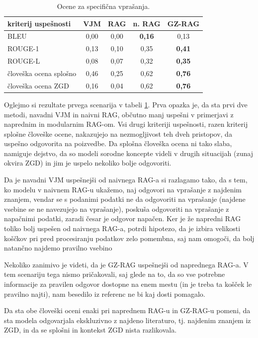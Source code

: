 \documentclass[a4paper,12pt,openright]{book}
\begin{document}
\begin{table}[H]
	\centering
	\caption{Ocene za specifična vprašanja.}
	\begin{tabular}{|l|c|c|c|c|}
		\hline
		kriterij uspešnosti    & VJM  & RAG  & n. RAG        & GZ-RAG        \\ \hline
		BLEU                   & 0,00 & 0,00 & \textbf{0,16} & 0,13          \\ \hline
		ROUGE-1                & 0,13 & 0,10 & 0,35          & \textbf{0,41} \\ \hline
		ROUGE-L                & 0,08 & 0,07 & 0,32          & \textbf{0,35} \\ \hline
		človeška ocena splošno & 0,46 & 0,25 & 0,62          & \textbf{0,76} \\ \hline
		človeška ocena ZGD     & 0,16 & 0,04 & 0,62          & \textbf{0,76} \\ \hline
	\end{tabular}
	\label{rez1}
\end{table}

Oglejmo si rezultate prvega scenarija v tabeli \ref{rez1}. Prva opazka je, da sta prvi dve metodi, navadni VJM in naivni RAG, občutno manj uspešni v primerjavi z naprednim in modularnim RAG-om. Vsi drugi kriteriji uspešnosti, razen kriterij splošne človeške ocene, nakazujejo na nezmogljivost teh dveh pristopov, da uspešno odgovorita na poizvedbe. Da splošna človeška ocena ni tako slaba, namiguje dejstvo, da so modeli sorodne koncepte videli v drugih situacijah (zunaj okvira ZGD) in jim je uspelo nekoliko bolje odgovoriti.

Da je navadni VJM uspešnejši od naivnega RAG-a si razlagamo tako, da s tem, ko modelu v naivnem RAG-u ukažemo, naj odgovori na vprašanje z najdenim znanjem, vendar se s podanimi podatki ne da odgovoriti na vprašanje (najdene vsebine se ne navezujejo na vprašanje), poskuša odgovoriti na vprašanje z napačnimi podatki, zaradi česar je odgovor napačen. Ker je že napredni RAG toliko bolj uspešen od naivnega RAG-a, potrdi hipotezo, da je izbira velikosti koščkov pri pred procesiranju podatkov zelo pomembna, saj nam omogoči, da bolj natančno najdemo pravilno vsebino

Nekoliko zanimivo je videti, da je GZ-RAG uspešnejši od naprednega RAG-a. V tem scenariju tega nismo pričakovali, saj glede na to, da so vse potrebne informacije za pravilen odgovor dostopne na enem mestu (in je treba ta košček le pravilno najti), nam besedilo iz referenc ne bi kaj dosti pomagalo.

Da sta obe človeški oceni enaki pri naprednem RAG-u in GZ-RAG-u pomeni, da sta modela odgovarjala ekskluzivno z najdeno literaturo, tj. najdenim znanjem iz ZGD, in da se splošni in kontekst ZGD nista razlikovala.
\end{document}
